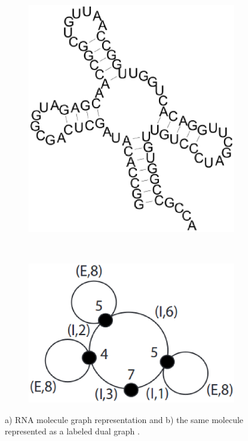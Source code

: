 \begin{figure}[ht]
    \centering
    \begin{subfigure}{.4\textwidth}
        \centering
        \includegraphics[width=\linewidth]{Figures/rna}
        \label{fig:rna}
        \caption{}
    \end{subfigure}
    \\
    \begin{subfigure}{.4\textwidth}
        \centering
        \includegraphics[width=\linewidth]{Figures/ldgrna}
        \label{fig:ldg}
        \caption{}
    \end{subfigure}
    \caption{a) RNA molecule graph representation and b) the same molecule represented
        as a labeled dual graph \cite{conf/psb/KarklinMH05}.}
    \label{fig:bio}
\end{figure}

